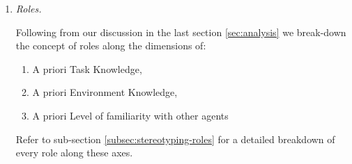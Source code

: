 \documentclass[letterpaper, 10 pt, conference]{ieeeconf}  %
\theoremstyle{definition}
\begin{document}
\begin{enumerate}
        \begin{enumerate}
            \item \textit{Roles.}
            {
            \color{blue}
            Following from our discussion in the last section \ref{sec:analysis} we break-down the concept of roles along the dimensions of:
            \begin{enumerate}
                \item A priori Task Knowledge,
                \item A priori Environment Knowledge,
                \item A priori Level of familiarity with other agents
            \end{enumerate}
            Refer to sub-section \ref{subsec:stereotyping-roles} for a detailed breakdown of every role along these axes.
            }
           

\end{enumerate}
\end{enumerate}
\end{document}
